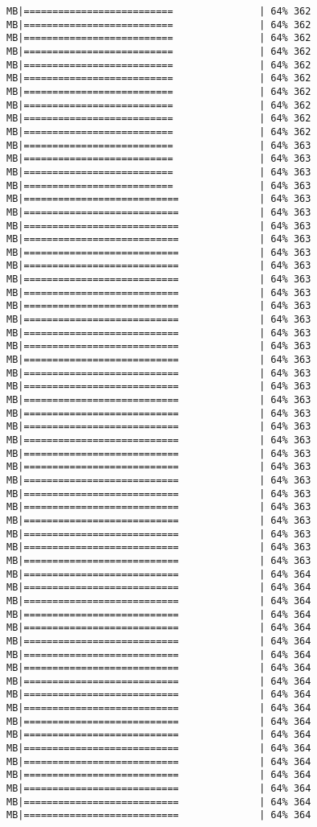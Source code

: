 \documentclass[
]{article}
\begin{document}
\begin{verbatim}
MB|==========================               | 64% 362 MB|==========================               | 64% 362 MB|==========================               | 64% 362 MB|==========================               | 64% 362 MB|==========================               | 64% 362 MB|==========================               | 64% 362 MB|==========================               | 64% 362 MB|==========================               | 64% 362 MB|==========================               | 64% 362 MB|==========================               | 64% 362 MB|==========================               | 64% 363 MB|==========================               | 64% 363 MB|==========================               | 64% 363 MB|==========================               | 64% 363 MB|===========================              | 64% 363 MB|===========================              | 64% 363 MB|===========================              | 64% 363 MB|===========================              | 64% 363 MB|===========================              | 64% 363 MB|===========================              | 64% 363 MB|===========================              | 64% 363 MB|===========================              | 64% 363 MB|===========================              | 64% 363 MB|===========================              | 64% 363 MB|===========================              | 64% 363 MB|===========================              | 64% 363 MB|===========================              | 64% 363 MB|===========================              | 64% 363 MB|===========================              | 64% 363 MB|===========================              | 64% 363 MB|===========================              | 64% 363 MB|===========================              | 64% 363 MB|===========================              | 64% 363 MB|===========================              | 64% 363 MB|===========================              | 64% 363 MB|===========================              | 64% 363 MB|===========================              | 64% 363 MB|===========================              | 64% 363 MB|===========================              | 64% 363 MB|===========================              | 64% 363 MB|===========================              | 64% 363 MB|===========================              | 64% 363 MB|===========================              | 64% 364 MB|===========================              | 64% 364 MB|===========================              | 64% 364 MB|===========================              | 64% 364 MB|===========================              | 64% 364 MB|===========================              | 64% 364 MB|===========================              | 64% 364 MB|===========================              | 64% 364 MB|===========================              | 64% 364 MB|===========================              | 64% 364 MB|===========================              | 64% 364 MB|===========================              | 64% 364 MB|===========================              | 64% 364 MB|===========================              | 64% 364 MB|===========================              | 64% 364 MB|===========================              | 64% 364 MB|===========================              | 64% 364 MB|===========================              | 64% 364 MB|===========================              | 64% 364 
\end{verbatim}
\end{document}
